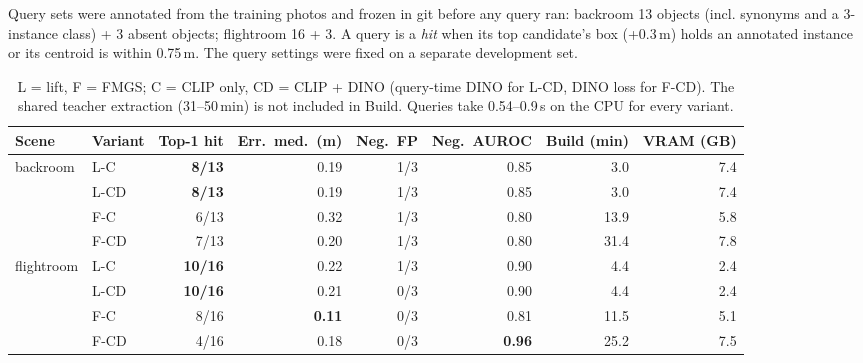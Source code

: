 \documentclass[11pt,a4paper]{article}
\begin{document}
Query sets were annotated from the training photos and frozen in git before any query ran:
backroom 13 objects (incl. synonyms and a 3-instance class) + 3 absent objects; flightroom 16 + 3.
A query is a \emph{hit} when its top candidate's box (+0.3\,m) holds an annotated instance or its
centroid is within 0.75\,m. The query settings were fixed on a separate development set.

\begin{table}[ht]
\centering\small
\begin{tabular}{@{}llrrrrrr@{}}
\toprule
Scene & Variant & Top-1 hit & Err.\ med.\ (m) & Neg.\ FP & Neg.\ AUROC & Build (min) & VRAM (GB) \\
\midrule
backroom & L-C  & \textbf{8/13} & 0.19 & 1/3 & 0.85 & 3.0 & 7.4 \\
         & L-CD & \textbf{8/13} & 0.19 & 1/3 & 0.85 & 3.0 & 7.4 \\
         & F-C  & 6/13 & 0.32 & 1/3 & 0.80 & 13.9 & 5.8 \\
         & F-CD & 7/13 & 0.20 & 1/3 & 0.80 & 31.4 & 7.8 \\
\midrule
flightroom & L-C  & \textbf{10/16} & 0.22 & 1/3 & 0.90 & 4.4 & 2.4 \\
           & L-CD & \textbf{10/16} & 0.21 & 0/3 & 0.90 & 4.4 & 2.4 \\
           & F-C  & 8/16 & \textbf{0.11} & 0/3 & 0.81 & 11.5 & 5.1 \\
           & F-CD & 4/16 & 0.18 & 0/3 & \textbf{0.96} & 25.2 & 7.5 \\
\bottomrule
\end{tabular}
\caption{L = lift, F = FMGS; C = CLIP only, CD = CLIP + DINO (query-time DINO for L-CD, DINO loss
for F-CD). The shared teacher extraction (31--50\,min) is not included in Build. Queries take
0.54--0.9\,s on the CPU for every variant.}
\end{table}
\end{document}
